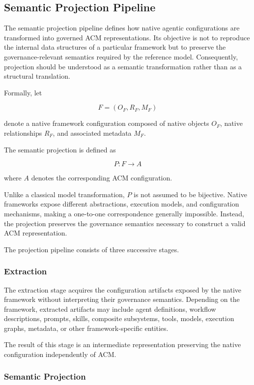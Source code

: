 \documentclass[10pt]{article}
\begin{document}
\subsection{Semantic Projection Pipeline}
\label{sec:semantic_projection}
The semantic projection pipeline defines how native agentic configurations are transformed into governed ACM representations. Its objective is not to reproduce the internal data structures of a particular framework but to preserve the governance-relevant semantics required by the reference model. Consequently, projection should be understood as a semantic transformation rather than as a structural translation.

Formally, let

\[
F=(O_F,R_F,M_F)
\]

denote a native framework configuration composed of native objects \(O_F\), native relationships \(R_F\), and associated metadata \(M_F\).

The semantic projection is defined as

\[
P:F\rightarrow A
\]

where \(A\) denotes the corresponding ACM configuration.

Unlike a classical model transformation, \(P\) is not assumed to be bijective. Native frameworks expose different abstractions, execution models, and configuration mechanisms, making a one-to-one correspondence generally impossible. Instead, the projection preserves the governance semantics necessary to construct a valid ACM representation.

The projection pipeline consists of three successive stages.

\subsubsection{Extraction}

The extraction stage acquires the configuration artifacts exposed by the native framework without interpreting their governance semantics. Depending on the framework, extracted artifacts may include agent definitions, workflow descriptions, prompts, skills, composite subsystems, tools, models, execution graphs, metadata, or other framework-specific entities.

The result of this stage is an intermediate representation preserving the native configuration independently of ACM.

\subsubsection{Semantic Projection}
\end{document}
